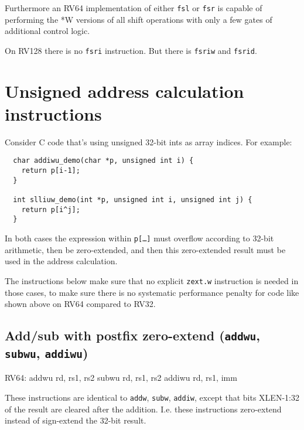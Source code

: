Furthermore an RV64 implementation of either {\tt fsl} or {\tt fsr} is capable
of performing the *W versions of all shift operations with only a few gates
of additional control logic.

On RV128 there is no {\tt fsri} instruction. But there is {\tt fsriw} and {\tt fsrid}.


\section{Unsigned address calculation instructions}

Consider C code that's using unsigned 32-bit ints as array indices. For example:

\begin{minipage}{\linewidth}
\begin{verbatim}
  char addiwu_demo(char *p, unsigned int i) {
    return p[i-1];
  }

  int slliuw_demo(int *p, unsigned int i, unsigned int j) {
    return p[i^j];
  }
\end{verbatim}
\end{minipage}

In both cases the expression within {\tt p[\dots]} must overflow according to
32-bit arithmetic, then be zero-extended, and then this zero-extended result
must be used in the address calculation.

The instructions below make sure that no explicit {\tt zext.w} instruction
is needed in those cases, to make sure there is no systematic performance
penalty for code like shown above on RV64 compared to RV32.

\subsection{Add/sub with postfix zero-extend ({\tt addwu}, {\tt subwu}, {\tt addiwu})}

\begin{rvb}
  RV64:
    addwu rd, rs1, rs2
    subwu rd, rs1, rs2
    addiwu rd, rs1, imm
\end{rvb}

These instructions are identical to {\tt addw}, {\tt subw}, {\tt addiw},
except that bits XLEN-1:32 of the result are cleared after the addition. I.e.
these instructions zero-extend instead of sign-extend the 32-bit result.



